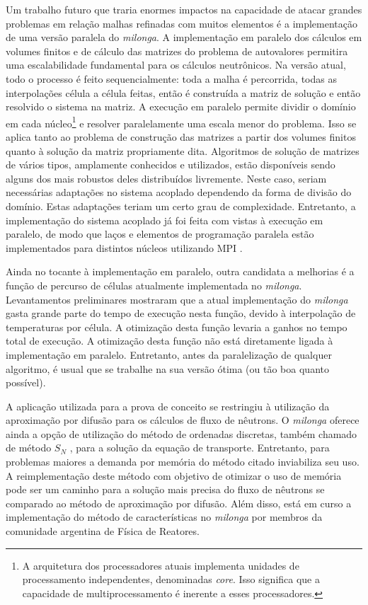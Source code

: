 Um trabalho futuro que traria enormes impactos na capacidade de atacar grandes problemas em relação malhas refinadas
com muitos elementos é a implementação de uma versão paralela do \textit{milonga}. A implementação em paralelo dos
cálculos em volumes finitos e de cálculo das matrizes do problema de autovalores permitira uma escalabilidade
fundamental para os cálculos neutrônicos. Na versão atual, todo o processo é feito sequencialmente: toda a malha
é percorrida, todas as interpolações célula a célula feitas, então é construída a matriz de solução e então resolvido
o sistema na matriz. A execução em paralelo permite dividir o domínio em cada núcleo\footnote{A arquitetura dos processadores
  atuais implementa unidades de processamento independentes, denominadas \textit{core}. Isso significa que a
capacidade de multiprocessamento é inerente a esses processadores.} e resolver paralelamente
uma escala menor do problema. Isso se aplica tanto ao problema de construção das matrizes a partir dos volumes finitos
quanto à solução da matriz propriamente dita. Algoritmos de solução de matrizes de vários tipos, amplamente conhecidos
e utilizados, estão disponíveis sendo alguns dos mais robustos deles \cite{Hernandez2005, Balay2016} distribuídos livremente.
Neste caso, seriam necessárias adaptações no sistema acoplado dependendo da forma de divisão do domínio. Estas adaptações teriam
um certo grau de complexidade. Entretanto, a implementação do sistema acoplado já foi feita com vistas à execução em paralelo,
de modo que laços e elementos de programação paralela estão implementados para distintos núcleos utilizando MPI \cite{Quinn2004}.

Ainda no tocante à implementação em paralelo, outra candidata a melhorias é a função de percurso de células atualmente
implementada no \textit{milonga}. Levantamentos preliminares mostraram que a atual implementação do \textit{milonga}
gasta grande parte do tempo de execução nesta função, devido à interpolação de temperaturas por célula. A otimização
desta função levaria a ganhos no tempo total de execução. A otimização desta função não está diretamente ligada à
implementação em paralelo. Entretanto, antes da paralelização de qualquer algoritmo, é usual que
se trabalhe na sua versão ótima (ou tão boa quanto possível).

A aplicação utilizada para a prova de conceito se restringiu à utilização da aproximação por difusão para os cálculos
de fluxo de nêutrons. O \textit{milonga} oferece ainda a opção de utilização do método de ordenadas discretas,
também chamado de método $S_N$ \cite{Hebert2009}, para a solução da equação de transporte. Entretanto, para problemas
maiores a demanda por memória do método citado inviabiliza seu uso. A reimplementação deste método com objetivo de
otimizar o uso de memória pode ser um caminho para a solução mais precisa do fluxo de nêutrons se comparado ao método
de aproximação por difusão. Além disso, está em curso a implementação do método de características \cite{Hebert2009} no \textit{milonga}
por membros da comunidade argentina de Física de Reatores.

